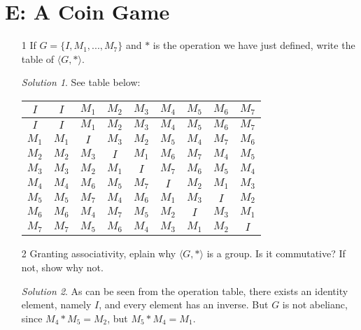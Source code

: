 \documentclass[11pt, b5paper, draft, fleqn]{book}
\theoremstyle{remark}
\newtheorem*{solution}{Solution}
\theoremstyle{plain}
\begin{document}
\section*{E: A Coin Game}
\begin{enumerate}
	\item[1] If \(G = \{I, M_1, ..., M_7\}\) and \(*\) is the operation we have just defined, write the table of \(\langle G, * \rangle\).
	\begin{solution}
		See table below: \\
		\begin{center}
		\begin{tabular}{ c | c c c c c c c c }
			\(I\) & \(I\) & \(M_1\) & \(M_2\) & \(M_3\) & \(M_4\) & \(M_5\) & \(M_6\) & \(M_7\) \\
			\hline
			\(I\) & \(I\) & \(M_1\) & \(M_2\) & \(M_3\) & \(M_4\) & \(M_5\) & \(M_6\) & \(M_7\) \\
			\(M_1\) & \(M_1\) & \(I\) & \(M_3\) & \(M_2\) & \(M_5\) & \(M_4\) & \(M_7\) & \(M_6\) \\
			\(M_2\) & \(M_2\) & \(M_3\) & \(I\) & \(M_1\) & \(M_6\) & \(M_7\) & \(M_4\) & \(M_5\) \\
			\(M_3\) & \(M_3\) & \(M_2\) & \(M_1\) & \(I\) & \(M_7\) & \(M_6\) & \(M_5\) & \(M_4\) \\
			\(M_4\) & \(M_4\) & \(M_6\) & \(M_5\) & \(M_7\) & \(I\) & \(M_2\) & \(M_1\) & \(M_3\) \\
			\(M_5\) & \(M_5\) & \(M_7\) & \(M_4\) & \(M_6\) & \(M_1\) & \(M_3\) & \(I\) & \(M_2\) \\
			\(M_6\) & \(M_6\) & \(M_4\) & \(M_7\) & \(M_5\) & \(M_2\) & \(I\) & \(M_3\) & \(M_1\) \\
			\(M_7\) & \(M_7\) & \(M_5\) & \(M_6\) & \(M_4\) & \(M_3\) & \(M_1\) & \(M_2\) & \(I\)
		\end{tabular}
		\end{center}
	\end{solution}
	
	\item[2] Granting associativity, eplain why \(\langle G, * \rangle\) is a group. Is it commutative? If not, show why not.
	\begin{solution}
		As can be seen from the operation table, there exists an identity element, namely \(I\), and every element has an inverse. But \(G\) is not abelianc, since \(M_4 * M_5 = M_2\), but \(M_5 * M_4 = M_1\).
	\end{solution}
\end{enumerate}
\end{document}
